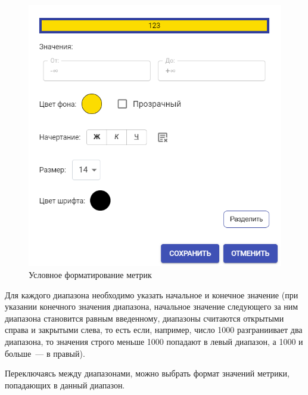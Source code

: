 \documentclass[../user-manual.tex]{subfiles}
\begin{document}
	\begin{figure}[h]
		\centering
		\includegraphics[width=\graphicswidth]{img/17-conditional-format.png}
		\caption{Условное форматирование метрик}
		\label{fig:conditional-format-1}
	\end{figure}
	
		
	Для каждого диапазона необходимо указать начальное и конечное значение (при указании конечного значения диапазона, начальное значение следующего за ним диапазона становится равным введенному, диапазоны считаются открытыми справа и закрытыми слева, то есть если, например, число 1000 разграниивает два диапазона, то значения строго меньше 1000 попадают в левый диапазон, а 1000 и больше~--- в правый).
	
	Переключаясь между диапазонами, можно выбрать формат значений метрики, попадающих в данный диапазон.
		
\end{document}
